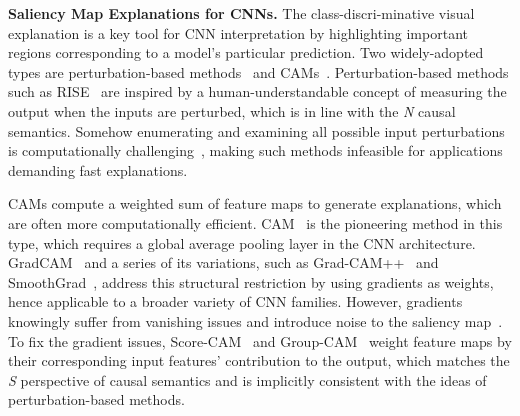 \noindent\textbf{Saliency Map Explanations for CNNs.}
The class-discri-minative visual explanation is a key tool for CNN interpretation by highlighting important regions corresponding to a model's particular prediction.
Two widely-adopted types are perturbation-based methods~\cite{zeiler2014visualizing,ribeiro2016should,petsiuk2018rise} and CAMs~\cite{zhou2016learning,selvaraju2017grad,chattopadhay2018grad,smilkov2017smoothgrad,wang2019score,zhang2021group}.
Perturbation-based methods such as RISE~\cite{petsiuk2018rise} are inspired by a human-understandable concept of measuring the output when the inputs are perturbed, which is in line with the \textit{N} causal semantics.
Somehow enumerating and examining all possible input perturbations is computationally challenging~\cite{ivanovs2021perturbation}, making such methods infeasible for applications demanding fast explanations.

CAMs compute a weighted sum of feature maps to generate explanations, which are often more computationally efficient.
CAM~\cite{zhou2016learning} is the pioneering method in this type, which requires a global average pooling layer in the CNN architecture.
GradCAM~\cite{selvaraju2017grad} and a series of its variations, such as Grad-CAM++~\cite{chattopadhay2018grad} and SmoothGrad~\cite{smilkov2017smoothgrad}, address this structural restriction by using gradients as weights, hence applicable to a broader variety of CNN families.
However, gradients knowingly suffer from vanishing issues and introduce noise to the saliency map~\cite{ghorbani2019interpretation}.
To fix the gradient issues, Score-CAM~\cite{wang2019score} and Group-CAM~\cite{zhang2021group} weight feature maps by their corresponding input features' contribution to the output, which matches the \textit{S} perspective of causal semantics and is implicitly consistent with the ideas of perturbation-based methods. 

